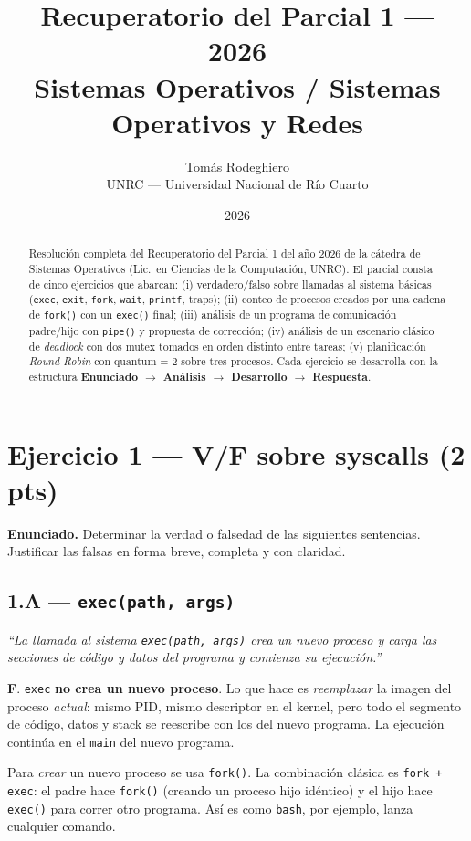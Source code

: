 \documentclass[11pt,a4paper]{article}
\title{
    \vspace{-2.5em}
    \textbf{Recuperatorio del Parcial 1 --- 2026} \\[0.3em]
    \large Sistemas Operativos / Sistemas Operativos y Redes
}
\author{
    Tomás Rodeghiero \\
    \small UNRC --- Universidad Nacional de Río Cuarto
}
\date{2026}
\begin{document}
\maketitle

\begin{abstract}
\noindent
Resolución completa del Recuperatorio del Parcial 1 del año 2026 de
la cátedra de Sistemas Operativos (Lic.\ en Ciencias de la
Computación, UNRC). El parcial consta de cinco ejercicios que abarcan:
(i) verdadero/falso sobre llamadas al sistema básicas (\texttt{exec},
\texttt{exit}, \texttt{fork}, \texttt{wait}, \texttt{printf}, traps);
(ii) conteo de procesos creados por una cadena de \texttt{fork()} con
un \texttt{exec()} final; (iii) análisis de un programa de
comunicación padre/hijo con \texttt{pipe()} y propuesta de corrección;
(iv) análisis de un escenario clásico de \emph{deadlock} con dos
mutex tomados en orden distinto entre tareas; (v) planificación
\emph{Round Robin} con quantum = 2 sobre tres procesos. Cada
ejercicio se desarrolla con la estructura \textbf{Enunciado $\to$
Análisis $\to$ Desarrollo $\to$ Respuesta}.
\end{abstract}

\tableofcontents
\bigskip

\section{Ejercicio 1 --- V/F sobre syscalls (2 pts)}

\textbf{Enunciado.} Determinar la verdad o falsedad de las siguientes
sentencias. Justificar las falsas en forma breve, completa y con
claridad.

\subsection*{1.A --- \texttt{exec(path, args)}}

\emph{``La llamada al sistema \texttt{exec(path, args)} crea un nuevo
proceso y carga las secciones de código y datos del programa y
comienza su ejecución.''}

\begin{respuesta}
\textbf{F}. \texttt{exec} \textbf{no crea un nuevo proceso}.
Lo que hace es \emph{reemplazar} la imagen del proceso \emph{actual}:
mismo PID, mismo descriptor en el kernel, pero todo el segmento de
código, datos y stack se reescribe con los del nuevo programa. La
ejecución continúa en el \texttt{main} del nuevo programa.

Para \emph{crear} un nuevo proceso se usa \texttt{fork()}. La
combinación clásica es \texttt{fork + exec}: el padre hace
\texttt{fork()} (creando un proceso hijo idéntico) y el hijo hace
\texttt{exec()} para correr otro programa. Así es como
\texttt{bash}, por ejemplo, lanza cualquier comando.
\end{respuesta}
\end{document}
